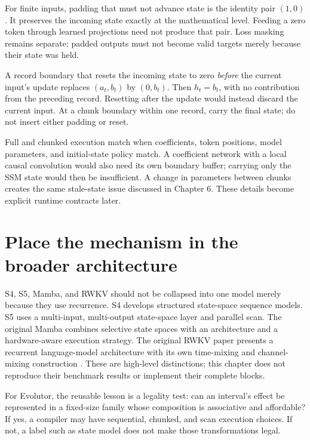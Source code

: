 For finite inputs, padding that must not advance state is the identity
pair $(1,0)$. It preserves the incoming state exactly at the mathematical
level. Feeding a zero token through learned projections need not produce
that pair. Loss masking remains separate: padded outputs must not become
valid targets merely because their state was held.

A record boundary that resets the incoming state to zero \emph{before}
the current input's update replaces $(a_t,b_t)$ by $(0,b_t)$.
Then $h_t=b_t$, with no contribution from the preceding record.
Resetting after the update would instead discard the current input.
At a chunk boundary within one record, carry the final state; do not
insert either padding or reset.


Full and chunked execution match when coefficients, token positions,
model parameters, and initial-state policy match. A coefficient network
with a local causal convolution would also need its own boundary buffer;
carrying only the SSM state would then be insufficient. A change in
parameters between chunks creates the same stale-state issue discussed
in Chapter 6. These details become explicit runtime contracts later.

\section{Place the mechanism in the broader architecture}

S4, S5, Mamba, and RWKV should not be collapsed into one model merely
because they use recurrence. S4 develops structured state-space sequence
models. S5 uses a multi-input, multi-output state-space layer and parallel
scan. The original Mamba combines selective state spaces with an
architecture and a hardware-aware execution strategy. The original
RWKV paper presents a recurrent language-model architecture with its own
time-mixing and channel-mixing construction \cite{s4,s5,mamba,rwkv}.
These are high-level distinctions; this chapter does not reproduce
their benchmark results or implement their complete blocks.

For Evolutor, the reusable lesson is a legality test:
can an interval's effect be represented in a fixed-size family whose
composition is associative and affordable? If yes, a compiler may have
sequential, chunked, and scan execution choices. If not, a label such as
state model does not make those transformations legal.

